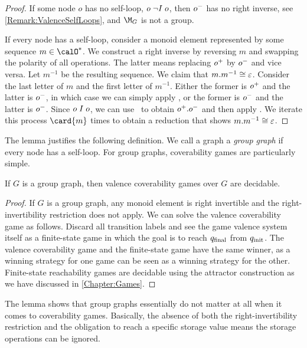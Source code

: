 \documentclass[../../diss.tex]{subfiles}
\begin{document}
\begin{proof}
    If some node $o$ has no self-loop, $o \mathrel{\neg I} o$, then ${o}^-$ has no right inverse, see \cref{Remark:ValenceSelfLoops}, and $\graphmonoid$ is not a group.

    If every node has a self-loop, consider a monoid element represented by some sequence $m \in \ops^*$.
    We construct a right inverse by reversing $m$ and swapping the polarity of all operations.
    The latter means replacing ${o}^+$ by ${o}^-$ and vice versa.
    Let $m^{-1}$ be the resulting sequence.
    We claim that $m.m^{-1} \cong \varepsilon$.
    Consider the last letter of $m$ and the first letter of $m^{-1}$.
    Either the former is ${o}^+$ and the latter is ${o}^-$, in which case we can simply apply \RuleCancel, or the former is ${o}^-$ and the latter is ${o}^-$.
    Since $o \mathrel{I} o$, we can use \RuleSwap~to obtain ${o}^+.{o}^-$ and then apply \RuleCancel.
    We iterate this process $\card{m}$ times to obtain a reduction that shows $m.m^{-1} \cong \varepsilon$.
\end{proof}

The lemma justifies the following definition.
We call a graph a \emph{group graph} if every node has a self-loop.
For group graphs, coverability games are particularly simple.

\begin{lemma}%
\label{Lemma:ValenceCoverabilityGamesGroup}%
    If $G$ is a group graph, then valence coverability games over $G$ are decidable.
\end{lemma}

\begin{proof}
    If $G$ is a group graph, any monoid element is right invertible and the right-invertibility restriction does not apply.
    We can solve the valence coverability game as follows.
    Discard all transition labels and see the game valence system itself as a finite-state game in which the goal is to reach $q_{\text{final}}$ from $q_{\text{init}}$.
    The valence coverability game and the finite-state game have the same winner, as a winning strategy for one game can be seen as a winning strategy for the other.
    Finite-state reachability games are decidable using the attractor construction as we have discussed in \cref{Chapter:Games}.
\end{proof}

The lemma shows that group graphs essentially do not matter at all when it comes to coverability games.
Basically, the absence of both the right-invertibility restriction and the obligation to reach a specific storage value means the storage operations can be ignored.
\end{document}
